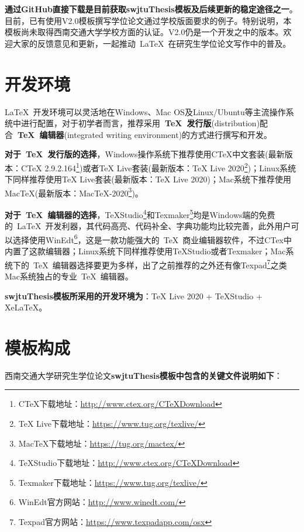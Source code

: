 \par
\textbf{通过GitHub直接下载是目前获取swjtuThesis模板及后续更新的稳定途径之一}。目前，已有使用V2.0模板撰写学位论文通过学校版面要求的例子。特别说明，本模板尚未取得西南交通大学学校方面的认证。V2.0仍是一个开发之中的版本。欢迎大家的反馈意见和更新，一起推动~\LaTeX{}~在研究生学位论文写作中的普及。

\section{开发环境}

\LaTeX{}~开发环境可以灵活地在Windows、Mac OS及Linux/Ubuntu等主流操作系统中进行配置，对于初学者而言，推荐采用\textbf{~\TeX~发行版}(distribution)配合\textbf{~\TeX~编辑器}(integrated writing environment)的方式进行撰写和开发。

\par
\textbf{对于~\TeX~发行版的选择}，Windows操作系统下推荐使用CTeX中文套装(最新版本：CTeX 2.9.2.164\footnote{CTeX下载地址：\url{http://www.ctex.org/CTeXDownload}})或者TeX Live套装(最新版本：TeX Live 2020\footnote{TeX Live下载地址：\url{https://www.tug.org/texlive/}})；Linux系统下同样推荐使用TeX Live套装(最新版本：TeX Live 2020)；Mac系统下推荐使用MacTeX(最新版本：MacTeX-2020\footnote{MacTeX下载地址：\url{https://tug.org/mactex/}})。

\par
\textbf{对于~\TeX~编辑器的选择}，TeXStudio\footnote{TeXStudio下载地址：\url{http://www.ctex.org/CTeXDownload}}和Texmaker\footnote{Texmaker下载地址：\url{https://www.tug.org/texlive/}}均是Windows端的免费的~\LaTeX{}~开发利器，其代码高亮、代码补全、字典功能均比较完善，此外用户可以选择使用WinEdt\footnote{WinEdt官方网站：\url{http://www.winedt.com/}}，这是一款功能强大的~\TeX~商业编辑器软件，不过CTex中内置了这款编辑器；Linux系统下同样推荐使用TeXStudio或者Texmaker；Mac系统下的~\TeX~编辑器选择要更为多样，出了之前推荐的之外还有像Texpad\footnote{Texpad官方网站：\url{https://www.texpadapp.com/osx}}之类Mac系统独占的专业~\TeX~编辑器。

\par
\textbf{swjtuThesis模板所采用的开发环境为}：TeX Live 2020 + TeXStudio + XeLaTeX。

\section{模板构成}

西南交通大学研究生学位论文\textbf{swjtuThesis模板中包含的关键文件说明如下}：

